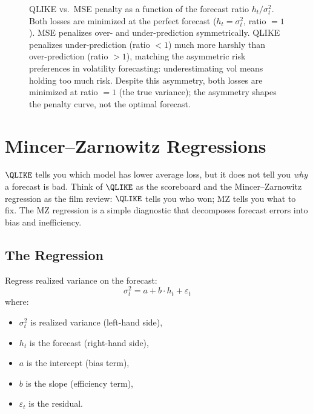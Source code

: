 \begin{figure}[ht]
\caption{QLIKE vs.\ MSE penalty as a function of the forecast ratio $h_t / \sigma^2_t$.
Both losses are minimized at the perfect forecast ($h_t = \sigma^2_t$, ratio $= 1$).
MSE penalizes over- and under-prediction symmetrically.
QLIKE penalizes under-prediction (ratio $< 1$) much more harshly than over-prediction (ratio $> 1$), matching the asymmetric risk preferences in volatility forecasting: underestimating vol means holding too much risk.
Despite this asymmetry, both losses are minimized at ratio $= 1$ (the true variance); the asymmetry shapes the penalty curve, not the optimal forecast.}
\label{fig:qlike-vs-mse}
\end{figure}


\section{Mincer--Zarnowitz Regressions}
\label{sec:eval-mz}

$\QLIKE$ tells you which model has lower average loss, but it does not tell you \emph{why} a forecast is bad.
Think of $\QLIKE$ as the scoreboard and the Mincer--Zarnowitz regression as the film review: $\QLIKE$ tells you who won; MZ tells you what to fix.
The MZ regression is a simple diagnostic that decomposes forecast errors into bias and inefficiency.

\subsection{The Regression}

Regress realized variance on the forecast:
\begin{equation}
\label{eq:mz}
\sigma^2_t = a + b \cdot h_t + \varepsilon_t
\end{equation}
where:
\begin{itemize}[nosep]
  \item $\sigma^2_t$ is realized variance (left-hand side),
  \item $h_t$ is the forecast (right-hand side),
  \item $a$ is the intercept (bias term),
  \item $b$ is the slope (efficiency term),
  \item $\varepsilon_t$ is the residual.
\end{itemize}

